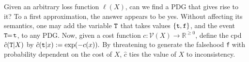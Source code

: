\documentclass[twoside]{article}
\makeatletter
\theoremstyle{plain}
\theoremstyle{definition}
\newcommand{\V}{\mathcal V}
\newcommand\aar{\@ifstar\aar@one@star\aar@plain}
\newcommand\aar@one@star{\@ifstar\aar@resize{\aar@plain*}}
\newcommand\aar@resize[1]{\sbox{\aar@content}{#1}\scaleleftright[3.8ex]
			{\Biggl\langle\!\!\!\!\Biggl\langle}{\usebox{\aar@content}}
			{\Biggr\rangle\!\!\!\!\Biggr\rangle}}
\makeatother
\begin{document}
\def\Truth{{\tt T}}
\def\trut{{\tt t}}
\def\truf{{\tt f}}

Given an arbitrary loss function $\ell(X)$, can we find a PDG that gives rise to it?
To a first approximation, the answer appears to be yes.
%
%
%
%
Without affecting its semantics, one may add the variable $\Truth$ that takes values $\{\trut, \truf\}$, and the event $\Truth \!\!=\! \trut$, to any PDG.
%
Now, given a
cost function $c: \V(X) \to \mathbb R^{\ge 0}$,
define the cpd $\hat c(\Truth |X)$ by
$
	\hat c(\trut | x) := \exp( - c(x)).
$
By threatening to generate the falsehood {\tt f} with probability dependent on the cost of $X$, $\hat c$ ties the value of $X$ to inconsistency.
%
\end{document}
